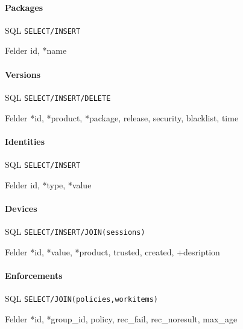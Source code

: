 \documentclass[10pt,a4paper]{scrartcl}
\begin{document}
\paragraph{Packages}
\begin{description*}
	\item[SQL] \texttt{SELECT/INSERT}
	\item[Felder] id, *name
\end{description*}

\paragraph{Versions}
\begin{description*}
	\item[SQL] \texttt{SELECT/INSERT/DELETE}
	\item[Felder] *id, *product, *package, release, security, blacklist, time
\end{description*}

\paragraph{Identities}
\begin{description*}
	\item[SQL] \texttt{SELECT/INSERT}
	\item[Felder] id, *type, *value
\end{description*}

\paragraph{Devices}
\begin{description*}
	\item[SQL] \texttt{SELECT/INSERT/JOIN(sessions)}
	\item[Felder] *id, *value, *product, trusted, created, +desription
\end{description*}

\paragraph{Enforcements}
\begin{description*}
	\item[SQL] \texttt{SELECT/JOIN(policies,workitems)}
	\item[Felder] *id, *group\_id, policy, rec\_fail, rec\_noresult, max\_age
\end{description*}
\end{document}
